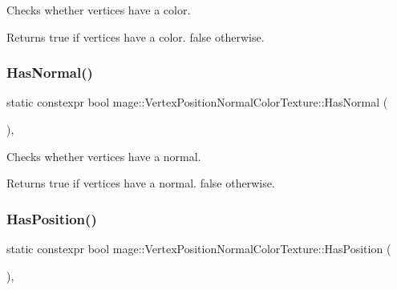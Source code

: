 Checks whether vertices have a color.

\begin{DoxyReturn}{Returns}
{\ttfamily true} if vertices have a color. {\ttfamily false} otherwise. 
\end{DoxyReturn}
\hypertarget{structmage_1_1_vertex_position_normal_color_texture_af1b565b25fd4beb2cff66931cc32de86}{}\label{structmage_1_1_vertex_position_normal_color_texture_af1b565b25fd4beb2cff66931cc32de86} 
\subsubsection{\texorpdfstring{Has\+Normal()}{HasNormal()}}
{\footnotesize\ttfamily static constexpr bool mage\+::\+Vertex\+Position\+Normal\+Color\+Texture\+::\+Has\+Normal (\begin{DoxyParamCaption}{ }\end{DoxyParamCaption})\hspace{0.3cm}{\ttfamily [static]}, {\ttfamily [noexcept]}}

Checks whether vertices have a normal.

\begin{DoxyReturn}{Returns}
{\ttfamily true} if vertices have a normal. {\ttfamily false} otherwise. 
\end{DoxyReturn}
\hypertarget{structmage_1_1_vertex_position_normal_color_texture_a493fdcc26dfbee8025da34f2d2600b1f}{}\label{structmage_1_1_vertex_position_normal_color_texture_a493fdcc26dfbee8025da34f2d2600b1f} 
\subsubsection{\texorpdfstring{Has\+Position()}{HasPosition()}}
{\footnotesize\ttfamily static constexpr bool mage\+::\+Vertex\+Position\+Normal\+Color\+Texture\+::\+Has\+Position (\begin{DoxyParamCaption}{ }\end{DoxyParamCaption})\hspace{0.3cm}{\ttfamily [static]}, {\ttfamily [noexcept]}}

